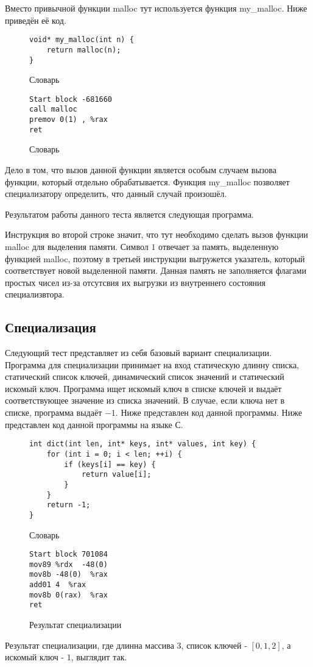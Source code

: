 \documentclass{spbau-diploma}
\begin{document}
Вместо привычной функции malloc тут используется функция my\_malloc. Ниже приведён её код.
\begin{wrapfigure}{r}{0.4\textwidth}
\begin{lstlisting}[xleftmargin = 20pt]
void* my_malloc(int n) {
    return malloc(n);
}
\end{lstlisting}
\caption{ Словарь}
\label{fig:speckmp}
\end{wrapfigure}
\begin{wrapfigure}{r}{0.4\textwidth}
\begin{lstlisting}[xleftmargin = 20pt]
Start block -681660
call malloc
premov 0(1) , %rax 
ret
\end{lstlisting}
\caption{ Словарь}
\label{fig:speckmp}
\end{wrapfigure}
Дело в том, что вызов данной функции является особым случаем вызова функции, который отдельно обрабатывается. Функция my\_malloc позволяет специализатору определить, что данный случай произошёл. 

Результатом работы данного теста является следующая программа.

Инструкция во второй строке значит, что тут необходимо сделать вызов функции malloc для выделения памяти. Символ $1$ отвечает за память, выделенную функцией malloc, поэтому в третьей инструкции выгружется указатель, который соответствует новой выделенной памяти. Данная память не заполняется флагами простых чисел из-за отсутсвия их выгрузки из внутреннего состояния специализвтора.

\subsection{ Специализация}
Следующий тест представляет из себя базовый вариант специализации. Программа для специализации принимает на вход статическую длинну списка, статический список ключей, динамический список значений и статический искомый ключ. Программа ищет искомый ключ в списке ключей и выдаёт соответствующее значение из списка значений. В случае, если ключа нет в списке, программа выдаёт $-1$. Ниже представлен код данной программы. Ниже представлен код данной программы на языке С.
\begin{figure}
\begin{lstlisting}[xleftmargin = 20pt]
int dict(int len, int* keys, int* values, int key) {
    for (int i = 0; i < len; ++i) {
        if (keys[i] == key) {
            return value[i];
        }
    }
    return -1;
}
\end{lstlisting}
\caption{ Словарь}
\label{fig:speckmp}
\end{figure}
\begin{wrapfigure}{r}{0.4\textwidth}
\begin{lstlisting}[xleftmargin = 20pt]
Start block 701084
mov89 %rdx  -48(0) 
mov8b -48(0)  %rax 
add01 4  %rax 
mov8b 0(rax)  %rax 
ret
\end{lstlisting}
\caption{ Результат специализации}
\label{fig:speckmp}
\end{wrapfigure}
Результат специализации, где длинна массива $3$, список ключей - $[0, 1, 2]$, а искомый ключ - $1$, выглядит так.
\end{document}
